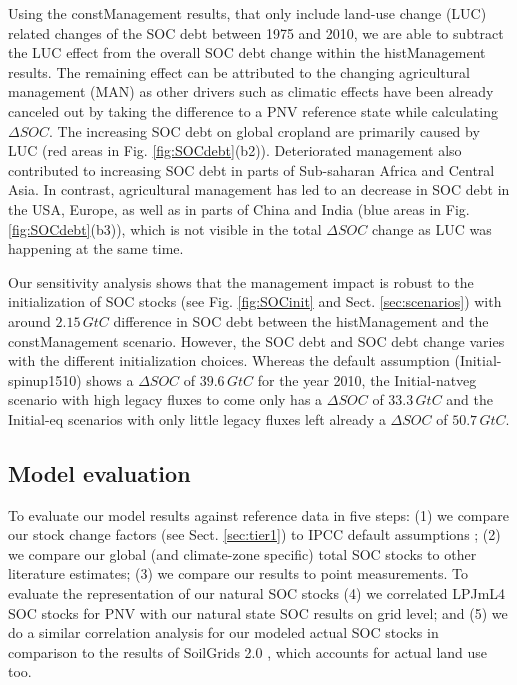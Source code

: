 \documentclass[gc, manuscript]{copernicus}
\begin{document}
Using the constManagement results, that only include land-use change (LUC) related changes of the SOC debt between 1975 and 2010, we are able to subtract the LUC effect from the overall SOC debt change within the histManagement results. The remaining effect can be attributed to the changing agricultural management (MAN) as other drivers such as climatic effects have been already canceled out by taking the difference to a PNV reference state while calculating \(\Delta SOC\).
The increasing SOC debt on global cropland are primarily caused by LUC (red areas in Fig. \ref{fig:SOCdebt}(b2)). Deteriorated management also contributed to increasing SOC debt in parts of Sub-saharan Africa and Central Asia. In contrast, agricultural management has led to an decrease in SOC debt in the USA, Europe, as well as in parts of China and India (blue areas in Fig. \ref{fig:SOCdebt}(b3)), which is not visible in the total \(\Delta SOC\) change as LUC was happening at the same time.

Our sensitivity analysis shows that the management impact is robust to the initialization of SOC stocks (see Fig. \ref{fig:SOCinit} and Sect. \ref{sec:scenarios}) with around \(2.15\,\unit{GtC}\) difference in SOC debt between the histManagement and the constManagement scenario. However, the SOC debt and SOC debt change varies with the different initialization choices. Whereas the default assumption (Initial-spinup1510) shows a \(\Delta SOC\) of \(39.6\,\unit{GtC}\) for the year 2010, the Initial-natveg scenario with high legacy fluxes to come only has a \(\Delta SOC\) of \(33.3\,\unit{GtC}\) and the Initial-eq scenarios with only little legacy fluxes left already a \(\Delta SOC\) of \(50.7\,\unit{GtC}\).

\hypertarget{sec:validate}{%
\subsection{Model evaluation}\label{sec:validate}}

To evaluate our model results against reference data in five steps: (1) we compare our stock change factors (see Sect. \ref{sec:tier1}) to IPCC default assumptions \citep{lasco_cropland_in_ipcc_2006, ogle_cropland_in_ipcc_2019}; (2) we compare our global (and climate-zone specific) total SOC stocks to other literature estimates; (3) we compare our results to point measurements. To evaluate the representation of our natural SOC stocks (4) we correlated LPJmL4 SOC stocks for PNV with our natural state SOC results on grid level; and (5) we do a similar correlation analysis for our modeled actual SOC stocks in comparison to the results of SoilGrids 2.0 \citep{poggio_soilgrids_2021}, which accounts for actual land use too.
\end{document}
